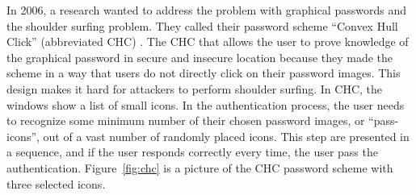   \begin{figure}[H]
    \centering
    \ContinuedFloat
  \end{figure}

  In 2006, a research wanted to address the problem with graphical passwords and the shoulder surfing problem. They called their password scheme ``Convex Hull Click'' (abbreviated CHC) \cite{Wiedenbeck}. The CHC that allows the user to prove knowledge of the graphical password in secure and insecure location because they made the scheme in a way that users do not directly click on their password images. This design makes it hard for attackers to perform shoulder surfing. In CHC, the windows show a list of small icons. In the authentication process, the user needs to recognize some minimum number of their chosen password images, or ``pass-icons'', out of a vast number of randomly placed icons. This step are presented in a sequence, and if the user responds correctly every time, the user pass the authentication. Figure~\ref{fig:chc} is a picture of the CHC password scheme with three selected icons.

